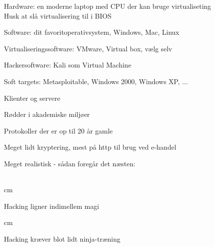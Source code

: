 \documentclass[20pt,landscape,a4paper,footrule]{foils}
\begin{document}


\begin{list2}
\item Hardware: en moderne laptop med CPU der kan bruge virtualiseting\\
Husk at slå virtualisering til i BIOS
\item Software: dit favoritoperativsystem, Windows, Mac, Linux
\item Virtualiseringssoftware: VMware, Virtual box, vælg selv
\item Hackersoftware: Kali som Virtual Machine 
\item Soft targets: Metasploitable, Windows 2000, Windows XP, ...
\end{list2}







\begin{list1}
\item Klienter og servere
\item Rødder i akademiske miljøer
\item Protokoller der er op til 20 år gamle
\item Meget lidt kryptering, mest på http til brug ved e-handel
\end{list1}


Meget realistisk - sådan foregår det næsten:\\
\\





 cm

\centerline{Hacking ligner indimellem  magi}




 cm
\centerline{Hacking kræver blot lidt ninja-træning}
\end{document}
